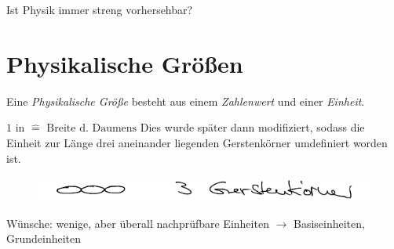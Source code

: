 \documentclass[a4paper,10pt]{scrartcl}
\begin{document}
\begin{seg}{Ist Physik immer streng vorhersehbar?}
\section{Physikalische Größen}
Eine \emph{Physikalische Größe} besteht aus einem \emph{Zahlenwert} und einer \emph{Einheit}.
\begin{ex*}
$1 \text{ in } \hat = \text{ Breite d. Daumens}$
Dies wurde später dann modifiziert, sodass die Einheit zur Länge drei aneinander liegenden Gerstenkörner umdefiniert worden ist.
\begin{figure}[h]
\includegraphics[scale=0.5]{fig4.png}
 \end{figure}
 
 Wünsche: wenige, aber überall nachprüfbare Einheiten $\rightarrow$ Basiseinheiten, Grundeinheiten
 \end{ex*}
 \end{seg}
\end{document}
